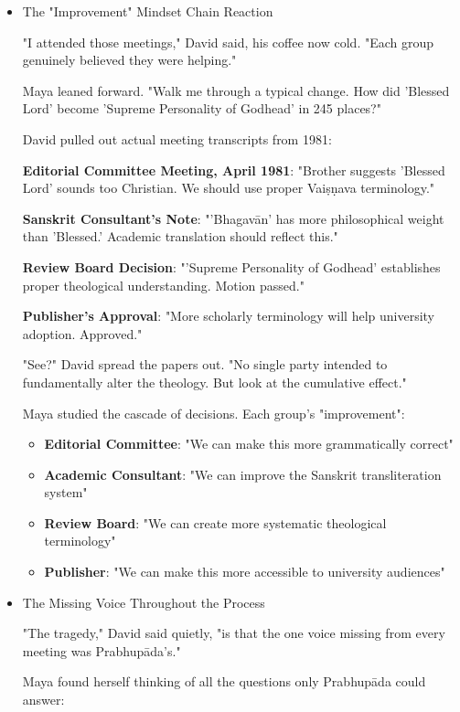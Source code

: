 \documentclass[11pt,twoside]{book}
\begin{document}
\begin{itemize}
\item The "Improvement" Mindset Chain Reaction
\label{sec:orgc4bc873}

"I attended those meetings," David said, his coffee now cold. "Each group genuinely believed they were helping."

Maya leaned forward. "Walk me through a typical change. How did 'Blessed Lord' become 'Supreme Personality of Godhead' in 245 places?"

David pulled out actual meeting transcripts from 1981:

\textbf{\textbf{Editorial Committee Meeting, April 1981}}: "Brother suggests 'Blessed Lord' sounds too Christian. We should use proper Vaiṣṇava terminology."

\textbf{\textbf{Sanskrit Consultant's Note}}: "'Bhagavān' has more philosophical weight than 'Blessed.' Academic translation should reflect this."

\textbf{\textbf{Review Board Decision}}: "'Supreme Personality of Godhead' establishes proper theological understanding. Motion passed."

\textbf{\textbf{Publisher's Approval}}: "More scholarly terminology will help university adoption. Approved."

"See?" David spread the papers out. "No single party intended to fundamentally alter the theology. But look at the cumulative effect."

Maya studied the cascade of decisions. Each group's "improvement":
\begin{itemize}
\item \textbf{\textbf{Editorial Committee}}: "We can make this more grammatically correct"
\item \textbf{\textbf{Academic Consultant}}: "We can improve the Sanskrit transliteration system"
\item \textbf{\textbf{Review Board}}: "We can create more systematic theological terminology"
\item \textbf{\textbf{Publisher}}: "We can make this more accessible to university audiences"
\end{itemize}
\item The Missing Voice Throughout the Process
\label{sec:org93f5c13}

"The tragedy," David said quietly, "is that the one voice missing from every meeting was Prabhupāda's."

Maya found herself thinking of all the questions only Prabhupāda could answer:


\end{itemize}
\end{document}

